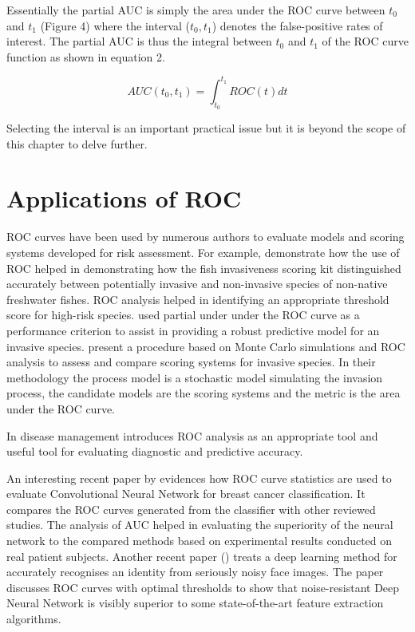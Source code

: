 Essentially the partial AUC is simply the area under the ROC curve between $t_{0}$ and $t_{1}$ (Figure 4) where the interval ($t_{0},t_{1}$) denotes the false-positive rates of interest. The partial AUC is thus the integral between $t_{0}$ and $t_{1}$ of the ROC curve function as shown in equation 2.

\begin{equation}\label{eq:partial-auc}
AUC(t_{0},t_{1}) = \int_{t_{0}}^{t_{1}} ROC(t)  dt
\end{equation}

Selecting the interval is an important practical issue but it is beyond the scope of this chapter to delve further.

\section{Applications of ROC}
ROC curves have been used by numerous authors to evaluate models and scoring systems developed for risk assessment. For example, \citet{copp2009screening} demonstrate how the use of ROC helped in demonstrating how the fish invasiveness scoring kit distinguished accurately between potentially invasive and non-invasive species of non-native freshwater fishes. ROC analysis helped in identifying an appropriate threshold score for high-risk species. \citet{heidy2010minfneginvspec} used partial under under the ROC curve as a performance criterion to assist in providing a robust predictive model for an invasive species. \citet{makowski2010scorsysinvpests} present a procedure based on Monte Carlo simulations and ROC analysis to assess and compare scoring systems for invasive species. In their methodology the process model is a stochastic model simulating the invasion process, the candidate models are the scoring systems and the metric is the area under the ROC curve.

In disease management \citet{linden2006diagpreddismgmt} introduces ROC analysis as an appropriate tool and useful tool for evaluating diagnostic and predictive accuracy.

An interesting recent paper by \citet{fung2018cnnbcancerclass} evidences how ROC curve statistics are used to evaluate Convolutional Neural Network for breast cancer classification. It compares the ROC curves generated from the classifier with other reviewed studies. The analysis of AUC helped in evaluating the superiority of the neural network to the compared methods based on experimental results conducted on real patient subjects. Another recent paper (\citep{linden2006diagpreddismgmt}) treats a deep learning method for accurately recognises an identity from seriously noisy face images. The paper discusses ROC curves with optimal thresholds to show that noise-resistant Deep Neural Network is visibly superior to some state-of-the-art feature extraction algorithms. 

